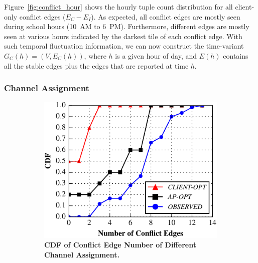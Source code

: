 Figure~\ref{fig:conflict_hour} shows the hourly tuple count distribution for
all client-only conflict edges ($E_C-E_I$). As expected, all conflict edges
are mostly seen during school hours (10~AM to 6~PM). Furthermore, different
edges are mostly seen at various hours indicated by the darkest tile of each
conflict edge. With such temporal fluctuation information, we can now
construct the time-variant $G_C(h)=(V, E_C(h))$, where $h$ is a given hour of
day, and $E(h)$ contains all the stable edges plus the edges that are
reported at time $h$.


\subsubsection{Channel Assignment}

\begin{figure}[t!]
  \centering
  \begin{subfigure}[t]{\columnwidth}
    \includegraphics[width=\textwidth]{./figures/DavisConflictEdge.pdf}
    \caption{\textbf{CDF of Conflict Edge Number of Different Channel Assignment.}}
    \label{fig:channel}
  \end{subfigure}\vspace*{0.2in}
  \begin{subfigure}[t]{\columnwidth}

\end{subfigure}
\end{figure}
